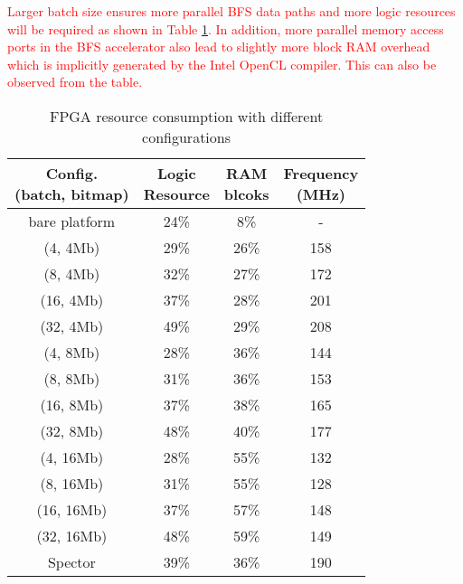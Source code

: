 \textcolor{red}{Larger batch size ensures more parallel BFS data paths and 
more logic resources will be required as shown in 
Table \ref{tab:resource}. In addition, more 
parallel memory access ports in the BFS accelerator also lead to 
slightly more block RAM overhead which is implicitly generated by the Intel 
OpenCL compiler. This can also be observed from the table.}

\begin{table}
  \caption{FPGA resource consumption with different configurations}
  \label{tab:resource}
  \color{red}
    \centering
  \begin{tabular}{cccc}
    \toprule
	\shortstack{Config. \\ (batch, bitmap)} & \shortstack{Logic \\ Resource} & \shortstack{RAM \\ blcoks} & \shortstack{Frequency \\ (MHz)} \\
	\midrule
	  bare platform   & 24\% & 8\%  & -   \\
	  \midrule
	  (4, 4Mb)   & 29\% & 26\% & 158 \\
	  (8, 4Mb)   & 32\% & 27\% & 172 \\
	  (16, 4Mb)  & 37\% & 28\% & 201 \\
	  (32, 4Mb)  & 49\% & 29\% & 208 \\
	  \midrule
	  (4, 8Mb)  & 28\% & 36\% & 144 \\
	  (8, 8Mb)  & 31\% & 36\% & 153 \\
	  (16, 8Mb) & 37\% & 38\% & 165 \\
	  (32, 8Mb) & 48\% & 40\% & 177 \\
	  \midrule
	  (4, 16Mb)  & 28\% & 55\% & 132 \\
	  (8, 16Mb)  & 31\% & 55\% & 128 \\
	  (16, 16Mb) & 37\% & 57\% & 148 \\
	  (32, 16Mb) & 48\% & 59\% & 149 \\
	  \midrule
      Spector    & 39\% & 36\% & 190 \\
  \bottomrule
\end{tabular}
\vspace{-1em}
\end{table}

